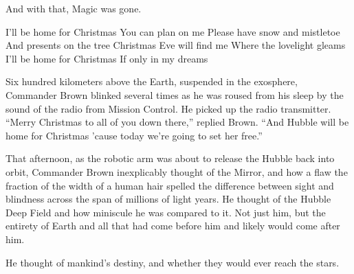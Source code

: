 And with that, Magic was gone.
\simpleline
{}

I’ll be home for Christmas
You can plan on me
Please have snow and mistletoe
And presents on the tree
Christmas Eve will find me
Where the lovelight gleams
I’ll be home for Christmas
If only in my dreams

Six hundred kilometers above the Earth, suspended in the exosphere, Commander Brown blinked several times as he was roused from his sleep by the sound of the radio from Mission Control. He picked up the radio transmitter.  “Merry Christmas to all of you down there,” replied Brown. “And Hubble will be home for Christmas ’cause today we’re going to set her free.”

That afternoon, as the robotic arm was about to release the Hubble back into orbit, Commander Brown inexplicably thought of the Mirror, and how a flaw the fraction of the width of a human hair spelled the difference between sight and blindness across the span of millions of light years. He thought of the Hubble Deep Field and how miniscule he was compared to it. Not just him, but the entirety of Earth and all that had come before him and likely would come after him.

He thought of mankind’s destiny, and whether they would ever reach the stars.

